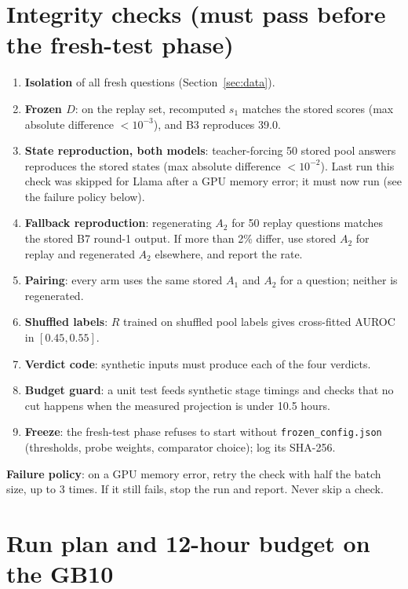 \documentclass[11pt]{article}
\begin{document}
\section{Integrity checks (must pass before the fresh-test phase)}\label{sec:checks}
\begin{enumerate}
  \item \textbf{Isolation} of all fresh questions (Section~\ref{sec:data}).
  \item \textbf{Frozen $D$}: on the replay set, recomputed $s_1$ matches the stored scores (max absolute difference
        $< 10^{-3}$), and B3 reproduces 39.0.
  \item \textbf{State reproduction, both models}: teacher-forcing 50 stored pool answers reproduces the stored
        states (max absolute difference $< 10^{-2}$). Last run this check was skipped for Llama after a GPU memory
        error; it must now run (see the failure policy below).
  \item \textbf{Fallback reproduction}: regenerating $A_2$ for 50 replay questions matches the stored B7 round-1
        output. If more than 2\% differ, use stored $A_2$ for replay and regenerated $A_2$ elsewhere, and report
        the rate.
  \item \textbf{Pairing}: every arm uses the same stored $A_1$ and $A_2$ for a question; neither is regenerated.
  \item \textbf{Shuffled labels}: $R$ trained on shuffled pool labels gives cross-fitted AUROC in $[0.45, 0.55]$.
  \item \textbf{Verdict code}: synthetic inputs must produce each of the four verdicts.
  \item \textbf{Budget guard}: a unit test feeds synthetic stage timings and checks that no cut happens when
        the measured projection is under 10.5 hours.
  \item \textbf{Freeze}: the fresh-test phase refuses to start without \texttt{frozen\_config.json} (thresholds,
        probe weights, comparator choice); log its SHA-256.
\end{enumerate}
\textbf{Failure policy}: on a GPU memory error, retry the check with half the batch size, up to 3 times. If it
still fails, stop the run and report. Never skip a check.

\section{Run plan and 12-hour budget on the GB10}\label{sec:budget}
\end{document}
